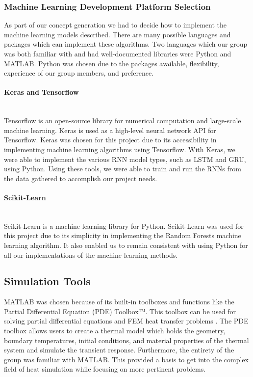 \subsubsection{Machine Learning Development Platform Selection} \label{ML_platform}
As part of our concept generation we had to decide how to implement the machine learning models described. There are many possible languages and packages which can implement these algorithms. Two languages which our group was both familiar with and had well-documented libraries were Python and MATLAB. Python was chosen due to the packages available, flexibility, experience of our group members, and preference.
\paragraph{Keras and Tensorflow} \, \\
Tensorflow is an open-source library for numerical computation and large-scale machine learning. Keras is used as a high-level neural network API for Tensorflow. Keras was chosen for this project due to its accessibility in implementing machine learning algorithms using Tensorflow. With Keras, we were able to implement the various RNN model types, such as LSTM and GRU, using Python. Using these tools, we were able to train and run the RNNs from the data gathered to accomplish our project needs.

\paragraph{Scikit-Learn}\, \\
Scikit-Learn is a machine learning library for Python. Scikit-Learn was used for this project due to its simplicity in implementing the Random Forests machine learning algorithm. It also enabled us to remain consistent with using Python for all our implementations of the machine learning methods.  
\subsection{Simulation Tools}
MATLAB was chosen because of its built-in toolboxes and functions like the Partial Differential Equation (PDE) Toolbox™. This toolbox can be used for solving partial differential equations and FEM heat transfer problems \cite{matlab}. The PDE toolbox allows users to create a thermal model which holds the geometry, boundary temperatures, initial conditions, and material properties of the thermal system and simulate the transient response. Furthermore, the entirety of the group was familiar with MATLAB. This provided a basis to get into the complex field of heat simulation while focusing on more pertinent problems.